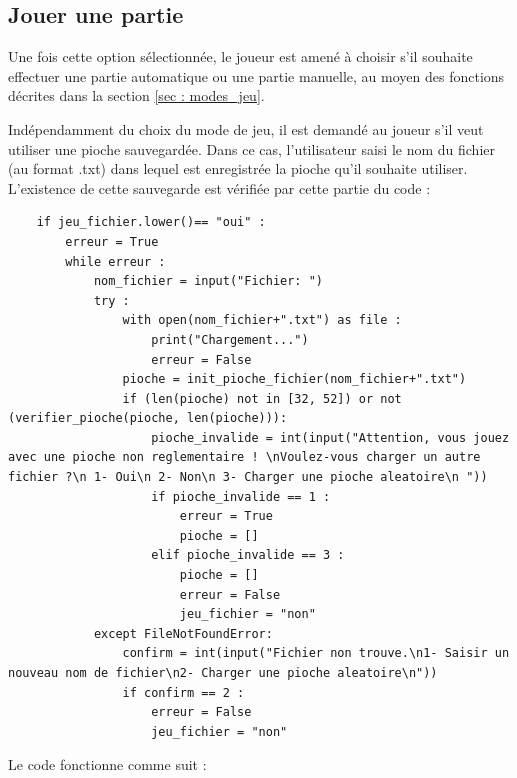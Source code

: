\documentclass[titlepage]{article}
\begin{document}
\subsection*{Jouer une partie}
Une fois cette option sélectionnée, le joueur est amené à choisir s'il souhaite effectuer une partie automatique ou une partie manuelle, au moyen des fonctions décrites dans la section \ref{sec : modes_jeu}. \par
Indépendamment du choix du mode de jeu, il est demandé au joueur s'il veut utiliser une pioche sauvegardée. Dans ce cas, l'utilisateur saisi le nom du fichier (au format .txt) dans lequel est enregistrée la pioche qu'il souhaite utiliser. L'existence de cette sauvegarde est vérifiée par cette partie du code :\par
	\begin{lstlisting}
	if jeu_fichier.lower()== "oui" :
		erreur = True
		while erreur : 
			nom_fichier = input("Fichier: ")
			try :
				with open(nom_fichier+".txt") as file :
					print("Chargement...")
					erreur = False
				pioche = init_pioche_fichier(nom_fichier+".txt")
				if (len(pioche) not in [32, 52]) or not (verifier_pioche(pioche, len(pioche))):
					pioche_invalide = int(input("Attention, vous jouez avec une pioche non reglementaire ! \nVoulez-vous charger un autre fichier ?\n 1- Oui\n 2- Non\n 3- Charger une pioche aleatoire\n "))
					if pioche_invalide == 1 :
						erreur = True
						pioche = []
					elif pioche_invalide == 3 :
						pioche = []
						erreur = False
						jeu_fichier = "non"
			except FileNotFoundError:
				confirm = int(input("Fichier non trouve.\n1- Saisir un nouveau nom de fichier\n2- Charger une pioche aleatoire\n"))
				if confirm == 2 :
					erreur = False
					jeu_fichier = "non"            
	\end{lstlisting}
	\par
Le code fonctionne comme suit :
\end{document}
